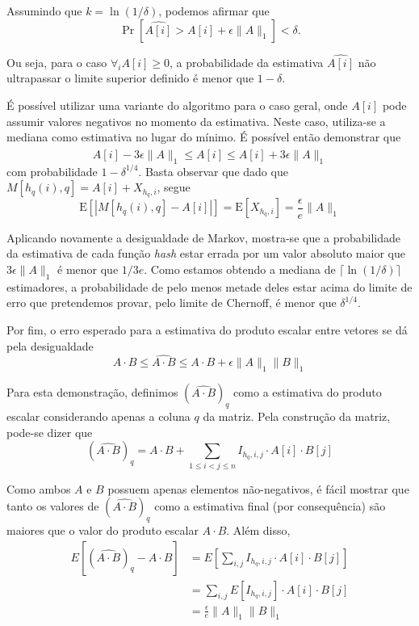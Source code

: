 Assumindo que $k = \ln(1/\delta)$, podemos afirmar que
\[
    \Pr\left[ \widehat{A[i]} > A[i] + \epsilon \lVert A \rVert_1 \right] < \delta\textrm{.}
\]

Ou seja, para o caso $\forall_i A[i] \geq 0$, a probabilidade da estimativa $\widehat{A[i]}$ não ultrapassar o limite superior definido é menor que $1 - \delta$.

É possível utilizar uma variante do algoritmo para o caso geral, onde $A[i]$ pode assumir valores negativos no momento da estimativa. Neste caso, utiliza-se a mediana como estimativa no lugar do mínimo. É possível então demonstrar que
\[
A[i] - 3 \epsilon \lVert A \rVert_1 \leq \widehat{A[i]} \leq A[i] + 3 \epsilon \lVert A \rVert_1
\]
com probabilidade $1 - \delta^{1/4}$. Basta observar que dado que $M[h_q(i), q] = A[i] + X_{h_q, i}$, segue
\[
\text{E}\left[ |M[h_q(i), q] - A[i]| \right] = \text{E}[X_{h_q,i}] = \frac{\epsilon}{e} \lVert A \rVert_1
\]

Aplicando novamente a desigualdade de Markov, mostra-se que a probabilidade da estimativa de cada função \emph{hash} estar errada por um valor absoluto maior que $3\epsilon \lVert A \rVert_1$ é menor que $1/3e$. Como estamos obtendo a mediana de $\lceil \ln(1/\delta) \rceil$ estimadores, a probabilidade de pelo menos metade deles estar acima do limite de erro que pretendemos provar, pelo limite de Chernoff, é menor que $\delta^{1/4}$.

Por fim, o erro esperado para a estimativa do produto escalar entre vetores se dá pela desigualdade
\[
    A \cdot B \leq \widehat{A \cdot B} \leq A \cdot B + \epsilon \lVert A \rVert_1 \lVert B \rVert_1
\]

Para esta demonstração, definimos $(\widehat{A \cdot B})_q$ como a estimativa do produto escalar considerando apenas a coluna $q$ da matriz. Pela construção da matriz, pode-se dizer que
\[
    (\widehat{A \cdot B})_q = A \cdot B + \sum_{1 \leq i < j \leq n} I_{h_q,i,j} \cdot A[i] \cdot B[j] 
\]

Como ambos $A$ e $B$ possuem apenas elementos não-negativos, é fácil mostrar que tanto os valores de $(\widehat{A \cdot B})_q$ como a estimativa final (por consequência) são maiores que o valor do produto escalar $A\cdot B$. Além disso,
\begin{align*}
    E\left[ (\widehat{A \cdot B})_q - A \cdot B \right] 
    &= E\left[ \sum_{i,j} I_{h_q,i,j} \cdot A[i] \cdot B[j]  \right] \\
    &= \sum_{i,j} E\left[ I_{h_q,i,j} \right] \cdot A[i] \cdot B[j] \\
    &= \frac{\epsilon}{e}   \lVert A \rVert_1 \lVert B \rVert_1
\end{align*}

